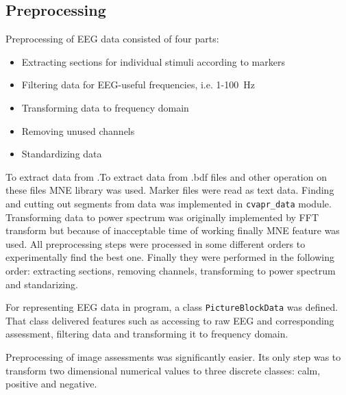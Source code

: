 \documentclass[10pt,journal,compsoc]{IEEEtran}
\begin{document}
\subsection{Preprocessing}
Preprocessing of EEG data consisted of four parts:
\begin{itemize}
\item{Extracting sections for individual stimuli according to markers}
\item{Filtering data for EEG-useful frequencies, i.e. 1-100~Hz}
\item{Transforming data to frequency domain}
\item{Removing unused channels}
\item{Standardizing data}
\end{itemize}

To extract data from .To extract data from .bdf files and other operation on these files MNE library was used. Marker files were read as text data. Finding and cutting out segments from data was implemented in \texttt{cvapr\_data} module. Transforming data to power spectrum was originally implemented by FFT transform but because of inacceptable time of working finally MNE feature was used. All preprocessing steps were processed in some different orders to experimentally find the best one. Finally they were performed in the following order: extracting sections, removing channels, transforming to power spectrum and standarizing.

For representing EEG data in program, a class \texttt{PictureBlockData} was defined. That class delivered features such as accessing to raw EEG and corresponding assessment, filtering data and transforming it to frequency domain.

Preprocessing of image assessments was significantly easier. Its only step was to transform two dimensional numerical values to three discrete classes: calm, positive and negative.
\end{document}
